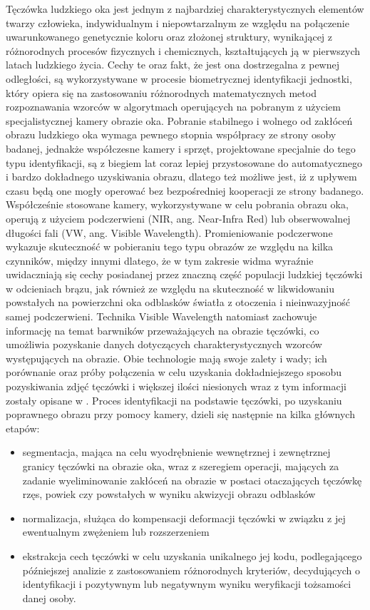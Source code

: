 Tęczówka ludzkiego oka jest jednym z najbardziej charakterystycznych elementów twarzy człowieka, indywidualnym i niepowtarzalnym ze względu na połączenie uwarunkowanego genetycznie koloru oraz złożonej struktury, wynikającej z różnorodnych procesów fizycznych i chemicznych, kształtujących ją w pierwszych latach ludzkiego życia. Cechy te oraz fakt, że jest ona  dostrzegalna z pewnej odległości, są wykorzystywane w procesie biometrycznej identyfikacji jednostki, który opiera się na zastosowaniu różnorodnych matematycznych metod rozpoznawania wzorców w algorytmach operujących na pobranym z użyciem specjalistycznej kamery obrazie oka.
	Pobranie stabilnego i wolnego od zakłóceń obrazu ludzkiego oka wymaga pewnego stopnia współpracy ze strony osoby badanej, jednakże współczesne kamery i sprzęt, projektowane specjalnie do tego typu identyfikacji, są z biegiem lat coraz lepiej przystosowane do automatycznego i bardzo dokładnego uzyskiwania obrazu, dlatego też możliwe jest, iż z upływem czasu będą one mogły operować bez bezpośredniej kooperacji ze strony badanego.
	Współcześnie stosowane kamery, wykorzystywane w celu pobrania obrazu oka, operują z użyciem podczerwieni (NIR, ang. Near-Infra Red) lub obserwowalnej długości fali (VW, ang. Visible Wavelength). Promieniowanie podczerwone wykazuje skuteczność w pobieraniu tego typu obrazów ze względu na kilka czynników, między innymi dlatego, że w tym zakresie widma wyraźnie uwidaczniają się cechy posiadanej przez znaczną część populacji ludzkiej tęczówki w  odcieniach brązu, jak również ze względu na skuteczność w likwidowaniu powstałych na powierzchni oka odblasków światła z otoczenia i nieinwazyjność samej podczerwieni. Technika Visible Wavelength natomiast zachowuje informację na temat barwników przeważających na obrazie tęczówki, co umożliwia pozyskanie danych dotyczących charakterystycznych wzorców występujących na obrazie. Obie technologie mają swoje zalety i wady; ich porównanie oraz próby połączenia w celu uzyskania dokładniejszego sposobu pozyskiwania zdjęć tęczówki i większej ilości niesionych wraz z tym informacji zostały opisane w \cite{Hos10}. 
	Proces identyfikacji na podstawie tęczówki, po uzyskaniu poprawnego obrazu przy pomocy kamery, dzieli się następnie na kilka głównych etapów: \begin{itemize}
\item segmentacja, mająca na celu wyodrębnienie wewnętrznej i zewnętrznej granicy tęczówki na obrazie oka, wraz z szeregiem operacji, mających za zadanie wyeliminowanie zakłóceń na obrazie w postaci otaczających tęczówkę rzęs, powiek czy powstałych w wyniku akwizycji obrazu odblasków
\item normalizacja, służąca do kompensacji deformacji tęczówki w związku z jej ewentualnym zwężeniem lub rozszerzeniem 
\item ekstrakcja cech tęczówki w celu uzyskania unikalnego jej kodu, podlegającego późniejszej analizie z zastosowaniem różnorodnych kryteriów, decydujących o identyfikacji i pozytywnym lub negatywnym wyniku weryfikacji tożsamości danej osoby.
\end{itemize}
